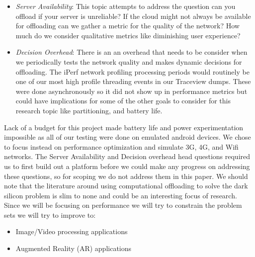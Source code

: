 \documentclass{sig-alternate}
\begin{document}
\begin{itemize}
\item \textit{Server Availability}:
This topic attempts to address the question can you offload if your server is unreliable? If the cloud might not always be available for offloading can we gather a metric for the quality of the network? How much do we consider qualitative metrics like diminishing user experience?
\item \textit{Decision Overhead}:
There is an an overhead that needs to be consider when we periodically tests the network quality and makes dynamic decisions for offloading. The iPerf network profiling processing periods would routinely be one of our most high profile threading events in our Traceview dumps. These were done asynchronously so it did not show up in performance metrics but could have implications for some of the other goals to consider for this research topic like partitioning, and battery life. 

\end{itemize}
Lack of a budget for this project made battery life and power experimentation impossible as all of our testing were done on emulated android devices. We chose to focus instead on performance optimization and simulate 3G, 4G, and Wifi networks. The Server Availability and Decision overhead head questions required us to first build out a platform before we could make any progress on addressing these questions, so for scoping we do not address them in this paper. We should note that the literature around using computational offloading to solve the dark silicon problem is slim to none and could be an interesting focus of research. Since we will be focusing on performance we will try to constrain the problem sets we will try to improve to:
\begin{itemize}
    \item Image/Video processing applications
    \item Augmented Reality (AR) applications
\end{itemize}
\end{document}
